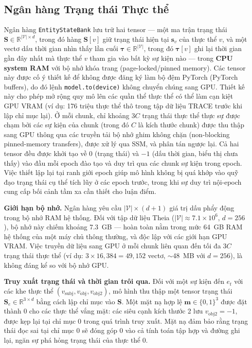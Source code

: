 \documentclass[letterpaper,twocolumn,10pt]{article}
\begin{document}
\subsection{Ngân hàng Trạng thái Thực thể}
\label{sec:entity_bank}

Ngân hàng \texttt{EntityStateBank} lưu trữ hai tensor --- một ma trận trạng thái $\mathbf{S} \in \mathbb{R}^{|\mathcal{V}| \times d}$, trong đó hàng $\mathbf{S}[v]$ giữ trạng thái hiện tại $\mathbf{s}_v$ của thực thể $v$, và một vectơ dấu thời gian nhìn thấy lần cuối $\boldsymbol{\tau} \in \mathbb{R}^{|\mathcal{V}|}$, trong đó $\boldsymbol{\tau}[v]$ ghi lại thời gian gần đây nhất mà thực thể $v$ tham gia vào bất kỳ sự kiện nào --- trong \textbf{CPU system RAM} với bộ nhớ khóa trang (page-locked/pinned memory). Các tensor này được cố ý thiết kế để không được đăng ký làm bộ đệm PyTorch (PyTorch buffers), do đó lệnh \texttt{model.to(device)} không chuyển chúng sang GPU. Thiết kế này cho phép mở rộng quy mô lên các quần thể thực thể có thể làm cạn kiệt GPU VRAM (ví dụ: 176 triệu thực thể thô trong tập dữ liệu TRACE trước khi lập chỉ mục lại). Ở mỗi chunk, chỉ khoảng $3C$ trạng thái thực thể thực sự được chạm bởi các sự kiện của chunk (trong đó $C$ là kích thước chunk) được thu thập sang GPU thông qua các truyền tải bộ nhớ ghim không chặn (non-blocking pinned-memory transfers), được xử lý qua SSM, và phân tán ngược lại. Cả hai tensor đều được khởi tạo về 0 (trạng thái) và $-1$ (dấu thời gian, biểu thị chưa thấy) vào đầu mỗi epoch đào tạo và duy trì qua các chunk sự kiện trong epoch. Việc thiết lập lại tại ranh giới epoch giúp mô hình không bị quá khớp vào quỹ đạo trạng thái cụ thể tích lũy ở các epoch trước, trong khi sự duy trì nội-epoch cung cấp bối cảnh tầm xa cần thiết cho luận điểm.

\textbf{Giới hạn bộ nhớ.} Ngân hàng yêu cầu $|\mathcal{V}| \times (d + 1)$ giá trị dấu phẩy động trong bộ nhớ RAM hệ thống. Đối với tập dữ liệu Theia ($|\mathcal{V}| \approx 7.1 \times 10^6$, $d = 256$), bộ nhớ này chiếm khoảng 7.3~GB --- hoàn toàn nằm trong mức 64~GB RAM hệ thống của một máy chủ thông thường, và độc lập với các giới hạn GPU VRAM. Việc truyền dữ liệu sang GPU ở mỗi chunk liên quan đến tối đa $3C$ trạng thái thực thể (ví dụ: $3 \times 16{,}384 = 49{,}152$ vectơ, $\sim$48~MB với $d=256$), là không đáng kể so với bộ nhớ GPU.

\textbf{Truy xuất trạng thái và thời gian trôi qua.} Đối với một sự kiện đến $e_t$ với các khe thực thể $(v_{\text{subj}}, v_{\text{obj}}, v_{\text{obj2}})$, mô hình thu thập một tensor trạng thái $\mathbf{S}_e \in \mathbb{R}^{3 \times d}$ bằng cách lập chỉ mục vào $\mathbf{S}$. Một mặt nạ hợp lệ $\mathbf{m} \in \{0, 1\}^3$ được đặt thành 0 cho các thực thể vắng mặt: các siêu cạnh kích thước 2 lưu $v_{\text{obj2}} = -1$, được kẹp lại tại chỉ mục 0 trong quá trình truy xuất. Mặt nạ đảm bảo rằng trạng thái đọc sai tại chỉ mục 0 sẽ đóng góp 0 vào cả tính toán tập hợp và đường ghi lại, ngăn sự phá hỏng trạng thái của thực thể 0.
\end{document}

